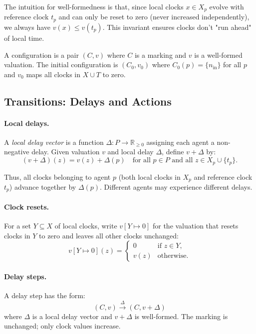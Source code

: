 The intuition for well-formedness is that, since local clocks $x \in X_p$ evolve with reference clock $t_p$ and can only be reset to zero (never increased independently), we always have $v(x) \leq v(t_p)$. This invariant ensures clocks don't "run ahead" of local time.

\begin{definition}[Configuration]
A \textsf{configuration} is a pair $(C, v)$ where $C$ is a marking and $v$ is a well-formed valuation. The \textsf{initial configuration} is $(C_0, v_0)$ where $C_0(p) = \{n_{\text{in}}\}$ for all $p$ and $v_0$ maps all clocks in $X \cup T$ to zero.
\end{definition}

\subsection{Transitions: Delays and Actions}

\paragraph{Local delays.} A \emph{local delay vector} is a function $\Delta : P \to \mathbb{R}_{\geq 0}$ assigning each agent a non-negative delay. Given valuation $v$ and local delay $\Delta$, define $v + \Delta$ by:
\[
(v + \Delta)(z) = v(z) + \Delta(p) \quad \text{for all } p \in P \text{ and all } z \in X_p \cup \{t_p\}.
\]

Thus, all clocks belonging to agent $p$ (both local clocks in $X_p$ and reference clock $t_p$) advance together by $\Delta(p)$. Different agents may experience different delays.

\paragraph{Clock resets.} For a set $Y \subseteq X$ of local clocks, write $v[Y \mapsto 0]$ for the valuation that resets clocks in $Y$ to zero and leaves all other clocks unchanged:
\[
v[Y \mapsto 0](z) = \begin{cases}
0 & \text{if } z \in Y, \\
v(z) & \text{otherwise}.
\end{cases}
\]

\paragraph{Delay steps.}
\begin{definition}
A delay step has the form:
\[
(C, v) \xrightarrow{\Delta} (C, v + \Delta)
\]
where $\Delta$ is a local delay vector and $v + \Delta$ is well-formed. The marking is unchanged; only clock values increase.
\end{definition}


